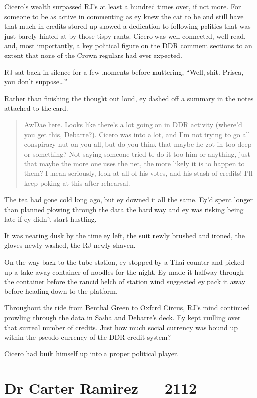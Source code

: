 Cicero's wealth surpassed RJ's at least a hundred times over, if not more. For someone to be as active in commenting as ey knew the cat to be and still have that much in credits stored up showed a dedication to following politics that was just barely hinted at by those tispy rants. Cicero was well connected, well read, and, most importantly, a key political figure on the DDR comment sections to an extent that none of the Crown regulars had ever expected.

RJ sat back in silence for a few moments before muttering, ``Well, shit. Prisca, you don't suppose\ldots{}''

Rather than finishing the thought out loud, ey dashed off a summary in the notes attached to the card.

\begin{quote}
AwDae here. Looks like there's a lot going on in DDR activity (where'd you get this, Debarre?). Cicero was into a lot, and I'm not trying to go all conspiracy nut on you all, but do you think that maybe he got in too deep or something? Not saying someone tried to do it too him or anything, just that maybe the more one uses the net, the more likely it is to happen to them? I mean seriously, look at all of his votes, and his stash of credits! I'll keep poking at this after rehearsal.
\end{quote}

The tea had gone cold long ago, but ey downed it all the same. Ey'd spent longer than planned plowing through the data the hard way and ey was risking being late if ey didn't start hustling.

It was nearing dusk by the time ey left, the suit newly brushed and ironed, the gloves newly washed, the RJ newly shaven.

On the way back to the tube station, ey stopped by a Thai counter and picked up a take-away container of noodles for the night. Ey made it halfway through the container before the rancid belch of station wind suggested ey pack it away before heading down to the platform.

Throughout the ride from Benthal Green to Oxford Circus, RJ's mind continued prowling through the data in Sasha and Debarre's deck. Ey kept mulling over that surreal number of credits. Just how much social currency was bound up within the pseudo currency of the DDR credit system?

Cicero had built himself up into a proper political player.

\chapter*{Dr Carter Ramirez — 2112}

